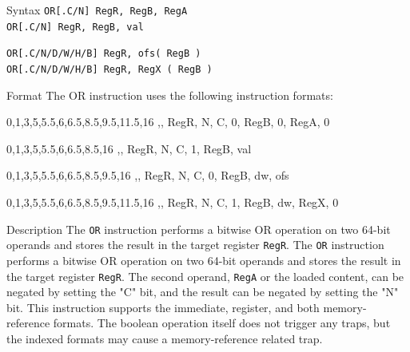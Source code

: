 %
%
\pagebreak
{}

\begin{iPageDescEntry}{Syntax}
  \texttt{OR[.C/N] RegR, RegB, RegA} \\
  \texttt{OR[.C/N] RegR, RegB, val}
  
  \texttt{OR[.C/N/D/W/H/B] RegR, ofs( RegB )} \\
  \texttt{OR[.C/N/D/W/H/B] RegR, RegX ( RegB )}
\end{iPageDescEntry}

\begin{iPageDescEntry}{Format}
  The OR instruction uses the following instruction formats: \\
	
  \begin{flushleft}	
  \drawInstrFormat
  	{0,1,3,5,5.5,6,6.5,8.5,9.5,11.5,16}
  	{\OpCodeGrpALU,\OpCodeOR, RegR, N, C, 0, RegB, 0, RegA, 0}
	
  \drawInstrFormat
  	{0,1,3,5,5.5,6,6.5,8.5,16}
  	{\OpCodeGrpALU,\OpCodeOR, RegR, N, C, 1, RegB, val}

  \drawInstrFormat
  	{0,1,3,5,5.5,6,6.5,8.5,9.5,16}
  	{\OpCodeGrpMEM,\OpCodeOR, RegR, N, C, 0, RegB, dw, ofs}
 
  \drawInstrFormat
  	{0,1,3,5,5.5,6,6.5,8.5,9.5,11.5,16}
  	{\OpCodeGrpMEM,\OpCodeOR, RegR, N, C, 1, RegB, dw, RegX, 0}
  \end{flushleft}
\end{iPageDescEntry}

\begin{iPageDescEntry}{Description}
  The \texttt{OR} instruction performs a bitwise OR operation on two 64-bit operands and stores the result in the target register \texttt{RegR}. The \texttt{OR} instruction performs a bitwise OR operation on two 64-bit operands and stores the result in the target register \texttt{RegR}. The second operand, \texttt{RegA} or the loaded content, can be negated by setting the "C" bit, and the result can be negated by setting the "N" bit. This instruction supports the immediate, register, and both memory-reference formats. The boolean operation itself does not trigger any traps, but the indexed formats may cause a memory-reference related trap.
\end{iPageDescEntry}

